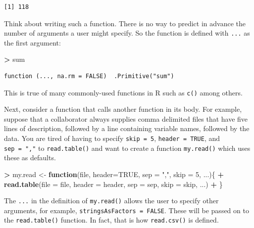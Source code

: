 \documentclass[]{krantz}
\makeatletter
\newenvironment{Shaded}{\begin{snugshade}}{\end{snugshade}}
\newcommand{\KeywordTok}[1]{\textcolor[rgb]{0.27,0.27,0.27}{\textbf{#1}}}
\newcommand{\DataTypeTok}[1]{\textcolor[rgb]{0.27,0.27,0.27}{#1}}
\newcommand{\DecValTok}[1]{\textcolor[rgb]{0.06,0.06,0.06}{#1}}
\newcommand{\StringTok}[1]{\textcolor[rgb]{0.5,0.5,0.5}{#1}}
\newcommand{\OtherTok}[1]{\textcolor[rgb]{0.37,0.37,0.37}{#1}}
\newcommand{\ControlFlowTok}[1]{\textcolor[rgb]{0.27,0.27,0.27}{\textbf{#1}}}
\newcommand{\OperatorTok}[1]{\textcolor[rgb]{0.43,0.43,0.43}{\textbf{#1}}}
\newcommand{\NormalTok}[1]{#1}
\newenvironment{kframe}{%
\medskip{}
\setlength{\fboxsep}{.8em}
 \def\at@end@of@kframe{}%
 \ifinner\ifhmode%
  \def\at@end@of@kframe{\end{minipage}}%
  \begin{minipage}{\columnwidth}%
 \fi\fi%
 \def\FrameCommand##1{\hskip\@totalleftmargin \hskip-\fboxsep
 \colorbox{shadecolor}{##1}\hskip-\fboxsep
     \hskip-\linewidth \hskip-\@totalleftmargin \hskip\columnwidth}%
 \MakeFramed {\advance\hsize-\width
   \@totalleftmargin\z@ \linewidth\hsize
   \@setminipage}}%
 {\par\unskip\endMakeFramed%
 \at@end@of@kframe}
\renewenvironment{Shaded}{\begin{kframe}}{\end{kframe}}
\makeatother
\begin{document}
\begin{verbatim}
[1] 118
\end{verbatim}

Think about writing such a function. There is no way to predict in
advance the number of arguments a user might specify. So the function is
defined with \texttt{...} as the first argument:

\begin{Shaded}
\begin{Highlighting}[]
\OperatorTok{>}\StringTok{ }\NormalTok{sum}
\end{Highlighting}
\end{Shaded}

\begin{verbatim}
function (..., na.rm = FALSE)  .Primitive("sum")
\end{verbatim}

This is true of many commonly-used functions in R such as \texttt{c()}
among others.

Next, consider a function that calls another function in its body. For
example, suppose that a collaborator always supplies comma delimited
files that have five lines of description, followed by a line containing
variable names, followed by the data. You are tired of having to specify
\texttt{skip\ =\ 5}, \texttt{header\ =\ TRUE}, and \texttt{sep\ =\ ","}
to \texttt{read.table()} and want to create a function
\texttt{my.read()} which uses these as defaults.

\begin{Shaded}
\begin{Highlighting}[]
\OperatorTok{>}\StringTok{ }\NormalTok{my.read <-}\StringTok{ }\ControlFlowTok{function}\NormalTok{(file, }\DataTypeTok{header=}\OtherTok{TRUE}\NormalTok{, }\DataTypeTok{sep =} \StringTok{","}\NormalTok{, }\DataTypeTok{skip =} \DecValTok{5}\NormalTok{, ...)\{}
\OperatorTok{+}\StringTok{     }\KeywordTok{read.table}\NormalTok{(}\DataTypeTok{file =}\NormalTok{ file, }\DataTypeTok{header =}\NormalTok{ header, }\DataTypeTok{sep =}\NormalTok{ sep, }\DataTypeTok{skip =}\NormalTok{ skip, ...)}
\OperatorTok{+}\StringTok{ }\NormalTok{\}}
\end{Highlighting}
\end{Shaded}

The \texttt{...} in the definition of \texttt{my.read()} allows the user
to specify other arguments, for example,
\texttt{stringsAsFactors\ =\ FALSE}. These will be passed on to the
\texttt{read.table()} function. In fact, that is how \texttt{read.csv()}
is defined.
\end{document}
